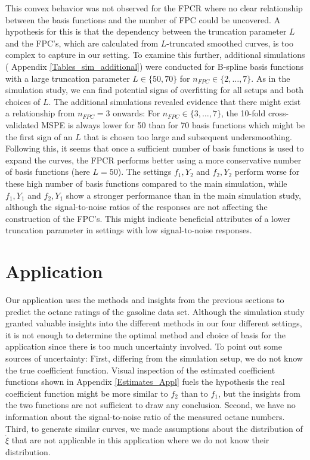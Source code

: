 \documentclass[11pt,twoside,a4paper]{article}
\begin{document}
	This convex behavior was not observed for the FPCR where no clear relationship between the basis functions and the number of FPC could be uncovered. A hypothesis for this is that the dependency between the truncation parameter $L$ and the FPC's, which are calculated from $L$-truncated smoothed curves, is too complex to capture in our setting. To examine this further, additional simulations ( Appendix \ref{Tables_sim_additional}) were conducted for B-spline basis functions with a large truncation parameter $L \in \{50, 70\}$ for $n_{FPC} \in \{2, \dots, 7 \}$. As in the simulation study, we can find potential signs of overfitting for all setups and both choices of $L$. The additional simulations revealed evidence that there might exist a relationship from $n_{FPC} = 3$ onwards: For $n_{FPC} \in \{3, \dots, 7 \}$, the 10-fold cross-validated MSPE is always lower for 50 than for 70 basis functions which might be the first sign of an $L$ that is chosen too large and subsequent undersmoothing. Following this, it seems that once a sufficient number of basis functions is used to expand the curves, the FPCR performs better using a more conservative number of basis functions (here $L = 50$). The settings $f_1,Y_2$ and $f_2,Y_2$ perform worse for these high number of basis functions compared to the main simulation, while $f_1,Y_1$ and $f_2,Y_1$ show a stronger performance than in the main simulation study, although the signal-to-noise ratios of the responses are not affecting the construction of the FPC's. This might indicate beneficial attributes of a lower truncation parameter in settings with low signal-to-noise responses.
	
	
	\section{Application}\label{Application}
		Our application uses the methods and insights from the previous sections to predict the octane ratings of the gasoline data set.
		Although the simulation study granted valuable insights into the different methods in our four different settings, it is not enough to determine the optimal method and choice of basis for the application since there is too much uncertainty involved. To point out some sources of uncertainty: First, differing from the simulation setup, we do not know the true coefficient function. Visual inspection of the estimated coefficient functions shown in Appendix \ref{Estimates_Appl} fuels the hypothesis the real coefficient function might be more similar to $f_2$ than to $f_1$, but the insights from the two functions are not sufficient to draw any conclusion. Second, we have no information about the signal-to-noise ratio of the measured octane numbers. Third, to generate similar curves, we made assumptions about the distribution of $\mathring{\xi}$ that are not applicable in this application where we do not know their distribution.
		 
\end{document}
